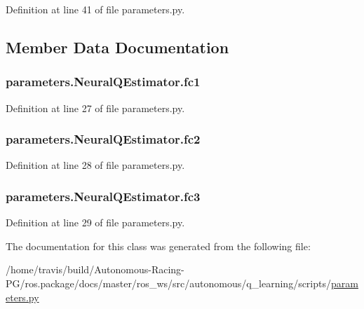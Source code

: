 Definition at line 41 of file parameters.\+py.



\subsection{Member Data Documentation}
\subsubsection[{\texorpdfstring{fc1}{fc1}}]{\setlength{\rightskip}{0pt plus 5cm}parameters.\+Neural\+Q\+Estimator.\+fc1}\hypertarget{classparameters_1_1_neural_q_estimator_ab0fb7d0e286565a2531f3ddb126e2592}{}\label{classparameters_1_1_neural_q_estimator_ab0fb7d0e286565a2531f3ddb126e2592}


Definition at line 27 of file parameters.\+py.

\subsubsection[{\texorpdfstring{fc2}{fc2}}]{\setlength{\rightskip}{0pt plus 5cm}parameters.\+Neural\+Q\+Estimator.\+fc2}\hypertarget{classparameters_1_1_neural_q_estimator_abd606711b39f423590adacb37c5b55d0}{}\label{classparameters_1_1_neural_q_estimator_abd606711b39f423590adacb37c5b55d0}


Definition at line 28 of file parameters.\+py.

\subsubsection[{\texorpdfstring{fc3}{fc3}}]{\setlength{\rightskip}{0pt plus 5cm}parameters.\+Neural\+Q\+Estimator.\+fc3}\hypertarget{classparameters_1_1_neural_q_estimator_ac48aa201a71a0e25e8ca7274a2cc5733}{}\label{classparameters_1_1_neural_q_estimator_ac48aa201a71a0e25e8ca7274a2cc5733}


Definition at line 29 of file parameters.\+py.



The documentation for this class was generated from the following file\+:\begin{DoxyCompactItemize}
\item 
/home/travis/build/\+Autonomous-\/\+Racing-\/\+P\+G/ros.\+package/docs/master/ros\+\_\+ws/src/autonomous/q\+\_\+learning/scripts/\hyperlink{parameters_8py}{parameters.\+py}\end{DoxyCompactItemize}
